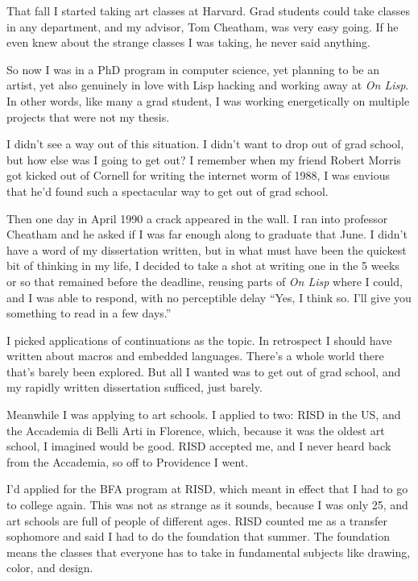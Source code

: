 \documentclass[12pt]{book}
\begin{document}
That fall I started taking art classes at Harvard. Grad students could
take classes in any department, and my advisor, Tom Cheatham, was very
easy going. If he even knew about the strange classes I was taking, he
never said anything.

So now I was in a PhD program in computer science, yet planning to be an
artist, yet also genuinely in love with Lisp hacking and working away at
\emph{On Lisp}. In other words, like many a grad student, I was working
energetically on multiple projects that were not my thesis.

I didn't see a way out of this situation. I didn't want to drop out of
grad school, but how else was I going to get out? I remember when my
friend Robert Morris got kicked out of Cornell for writing the internet
worm of 1988, I was envious that he'd found such a spectacular way to
get out of grad school.

Then one day in April 1990 a crack appeared in the wall. I ran into
professor Cheatham and he asked if I was far enough along to graduate
that June. I didn't have a word of my dissertation written, but in what
must have been the quickest bit of thinking in my life, I decided to
take a shot at writing one in the 5 weeks or so that remained before the
deadline, reusing parts of \emph{On Lisp} where I could, and I was able
to respond, with no perceptible delay ``Yes, I think so. I'll give you
something to read in a few days.''

I picked applications of continuations as the topic. In retrospect I
should have written about macros and embedded languages. There's a whole
world there that's barely been explored. But all I wanted was to get out
of grad school, and my rapidly written dissertation sufficed, just
barely.

Meanwhile I was applying to art schools. I applied to two: RISD in the
US, and the Accademia di Belli Arti in Florence, which, because it was
the oldest art school, I imagined would be good. RISD accepted me, and I
never heard back from the Accademia, so off to Providence I went.

I'd applied for the BFA program at RISD, which meant in effect that I
had to go to college again. This was not as strange as it sounds,
because I was only 25, and art schools are full of people of different
ages. RISD counted me as a transfer sophomore and said I had to do the
foundation that summer. The foundation means the classes that everyone
has to take in fundamental subjects like drawing, color, and design.
\end{document}

